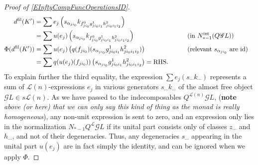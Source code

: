 \documentclass[11pt]{amsart}
\theoremstyle{plain}
\theoremstyle{definition}
\newcommand{\scrG}{\mathscr{G}}
\newcommand{\calL}{\mathcal{L}}
\theoremstyle{plain}
\newcommand{\BSW}{{\scrG}}
\newcommand{\Id}{\textup{id}}
\begin{document}
\begin{Composite functor spectral sequences}
\begin{tricky proofs of operation compatibilities}
\begin{proof}[Proof of \ref{EInftyCompFuncOperationsID}]
\begin{alignat*}{2}
d^\textup{fil}(K')
&=
\sum e_j\left(s_{\alpha_{ji_0}} k_{f^0_{ji_0}g^1_{ji_0i_1}h^2_{ji_0i_1i_2}}\right)%
\\
&=
\sum u(e_j)\left(s_{\alpha_{ji_0}} k_{f^0_{ji_0}g^1_{ji_0i_1}h^2_{ji_0i_1i_2}}\right)%
&\qquad&\text{(in $N_{*-1}^\textup{int}(Q\BSW L)$)}\\
\Phi(d^\textup{fil}(K'))&=
\sum u(e_j)\left( q(f_{ji_0})(s_{\alpha_{ji_0}}g^1_{ji_0i_1}h^2_{ji_0i_1i_2})\right)%
&\qquad&\text{(relevant $s_{\alpha_{ji_0}}$ are $\Id$)}\\
&=
\sum q(u(e_j)(f_{ji_0}))\left(s_{\alpha_{ji_0}} {g^1_{ji_0i_1}h^2_{ji_0i_1i_2}}\right) =\textup{RHS}.
\end{alignat*}
To explain further the third equality,  the expression $\sum e_j(s_{\cdots }k_{\cdots })$ represents a sum of $\calL(n)$-expressions $e_j$ in various generators $s_{\cdots }k_{\cdots }$ of the almost free object $\BSW L\in s\calL(n)$. As we have passed to the indecomposables $Q^{\calL(n)}\BSW L$, (\textbf{note}\emph{ above (or here) that we can only say this kind of thing as the monad is really homogeneous}), any non-unit expression is sent to zero, and an expression only lies in the normalization $N_{*-1}Q^{\calL}\BSW L$ if its unital part consists only of classes $z_{\cdots}$ and $h_{\cdots }$, and not of their degeneracies. Thus, any degeneracies $s_{\cdots }$ appearing in the unital part $u(e_j)$ are in fact simply the identity, and can be ignored when we apply $\Phi$.
\end{proof}
\end{tricky proofs of operation compatibilities}

\end{Composite functor spectral sequences}
\end{document}
